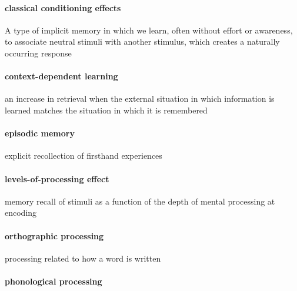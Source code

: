 \documentclass[
]{krantz}
\begin{document}
\paragraph*{classical conditioning effects}\label{classical-conditioning-effects}

A type of implicit memory in which we learn, often without effort or awareness, to associate neutral stimuli with another stimulus, which creates a naturally occurring response

\paragraph*{context-dependent learning}\label{context-dependent-learning}

an increase in retrieval when the external situation in which information is learned matches the situation in which it is remembered

\paragraph*{episodic memory}\label{episodic-memory}

explicit recollection of firsthand experiences

\paragraph*{levels-of-processing effect}\label{levels-of-processing-effect}

memory recall of stimuli as a function of the depth of mental processing at encoding

\paragraph*{orthographic processing}\label{orthographic-processing}

processing related to how a word is written

\paragraph*{phonological processing}\label{phonological-processing}
\end{document}

